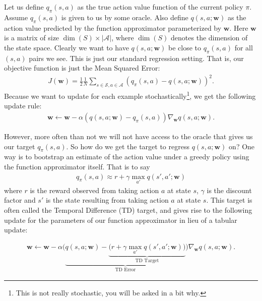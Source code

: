 \documentclass[11pt,addpoints,answers]{exam}
\newcommand{\wv}{\mathbf{w}}
\begin{document}
\begin{questions}
\begin{parts}
    Let us define $q_\pi(s, a)$ as the true action value function of the current policy $\pi$. Assume $q_\pi(s,a)$ is given to us by some oracle. Also define $q(s, a; \wv)$ as the action value predicted by the function approximator parameterized by $\wv$. Here $\wv$ is a matrix of size $\dim(S) \times |\mathcal{A}|$, where $\dim(S)$ denotes the dimension of the state space. Clearly we want to have $q(s, a; \wv)$ be close to $q_\pi(s, a)$ for all $(s, a)$ pairs we see. This is just our standard regression setting. That is, our objective function is just the Mean Squared Error:
    \begin{align}
    J(\wv) = \frac{1}{2} \frac{1}{N} \sum_{s\in\mathcal{S}, a\in\mathcal{A}} \left(q_\pi(s, a) - q(s, a; \wv) \right)^2.
    \end{align}
    Because we want to update for each example stochastically\footnote{This is not really stochastic, you will be asked in a bit why.}, we get the following update rule:
    \begin{align}
    \wv \leftarrow \wv - \alpha \left(q(s, a; \wv) - q_\pi(s,a) \right) \nabla_\wv q(s, a; \wv).
    \end{align}
    
    However, more often than not we will not have access to the oracle that gives us our target $q_\pi(s, a)$. So how do we get the target to regress $q(s, a; \wv)$ on? One way is to bootstrap an estimate of the action value under a greedy policy using the function approximator itself. That is to say
    \begin{align}
    q_\pi (s, a) \approx r + \gamma \max_{a'} q(s', a'; \wv)
    \end{align}
    where $r$ is the reward observed from taking action $a$ at state $s$, $\gamma$ is the discount factor and $s'$ is the state resulting from taking action $a$ at state $s$. This target is often called the Temporal Difference (TD) target, and gives rise to the following update for the parameters of our function approximator in lieu of a tabular update:
    
    \begin{align}
    \wv \leftarrow \wv - \alpha \bigg( \underbrace{q(s, a; \wv) - \underbrace{\big (r + \gamma \max_{a'}q(s', a'; \wv)\big)}_{\text{TD Target}}}_{\text{TD Error}} \bigg) \nabla_\wv q(s, a; \wv).
    \end{align}
    

\end{parts}
\end{questions}
\end{document}
